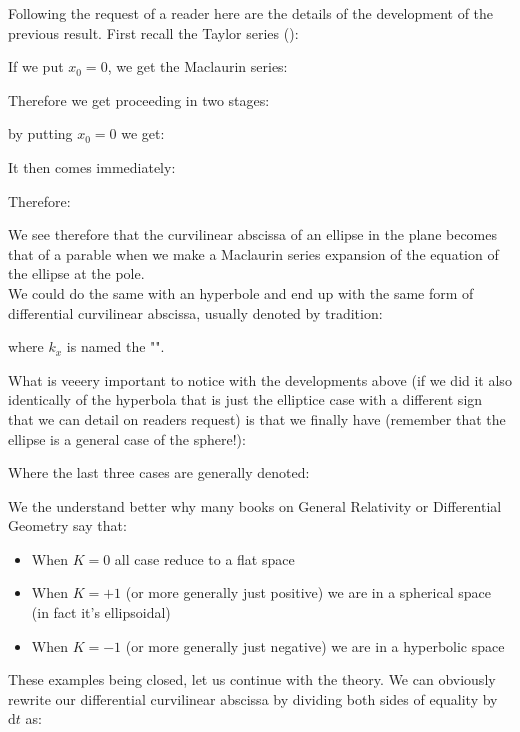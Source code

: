 {\begin{tcolorbox}[colframe=black,colback=white,sharp corners]
	Following the request of a reader here are the details of the development of the previous result. First recall the Taylor series ():
	
	If we put $x_0=0$, we get the Maclaurin series:
	
	Therefore we get proceeding in two stages:
	
	\end{tcolorbox}
	\begin{tcolorbox}[colframe=black,colback=white,sharp corners]
	
	by putting $x_0=0$ we get:
	
	It then comes immediately:
	
	Therefore:
	
	\end{tcolorbox}
	
	\pagebreak
	\begin{tcolorbox}[colframe=black,colback=white,sharp corners]
	We see therefore that the curvilinear abscissa of an ellipse in the plane becomes that of a parable when we make a Maclaurin series expansion of the equation of the ellipse at the pole.\\
	
	We could do the same with an hyperbole and end up with the same form of differential curvilinear abscissa, usually denoted by tradition:
	
	where $k_x$ is named the "".
	\end{tcolorbox}
	What is veeery important to notice with the developments above (if we did it also identically of the hyperbola that is just the elliptice case with a different sign that we can detail on readers request) is that we finally have (remember that the ellipse is a general case of the sphere!):
	
	Where the last three cases are generally denoted:
	
	We the understand better why many books on General Relativity or Differential Geometry say that:
	\begin{itemize}
		\item When $K=0$ all case reduce to a flat space
		
		\item When $K=+1$ (or more generally just positive) we are in a spherical space (in fact it's ellipsoidal)
		
		\item When $K=-1$ (or more generally just negative) we are in a hyperbolic space
	\end{itemize}
	These examples being closed, let us continue with the theory. We can obviously rewrite our differential curvilinear abscissa by dividing both sides of equality by $\mathrm{d}t$ as:
	
}
